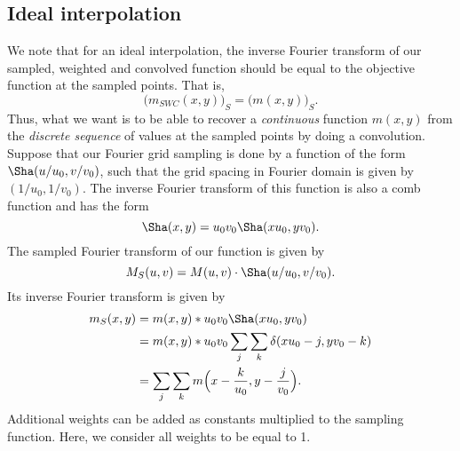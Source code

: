 \documentclass[11pt]{article}
\begin{document}
\subsection{Ideal interpolation}
We note that for an ideal interpolation, the inverse Fourier transform of our sampled, weighted and convolved function should be equal to the objective function at the sampled points. That is,
\begin{equation}
\Bigg(m_{SWC}(x,y)\Bigg)_S = \Bigg(m(x,y)\Bigg)_S.
\end{equation}
Thus, what we want is to be able to recover a \emph{continuous} function $m(x,y)$ from the \emph{discrete sequence} of values at the sampled points by doing a convolution.
Suppose that our Fourier grid sampling is done by a function of the form $\Sha(u/u_0,v/v_0)$, such that the grid spacing in Fourier domain is given by $(1/u_0, 1/v_0)$. The inverse Fourier transform of this function is also a comb function and has the form
\begin{equation}
\Sha(x,y) = u_0 v_0 \Sha(xu_0, yv_0).
\end{equation}
The sampled Fourier transform of our function is given by
\begin{equation}
M_{S}(u,v) = M(u,v) \cdot \Sha(u/u_0, v/v_0).
\end{equation}
Its inverse Fourier transform is given by
\begin{align}
m_{S}(x,y) &= m(x,y) \ast u_0v_0\Sha(xu_0, yv_0)\\
&= m(x,y) \ast u_0v_0\sum_j \sum_k \delta(xu_0-j, yv_0-k)\\
&=\sum_j \sum_k m\Big(x - \frac{k}{u_0}, y - \frac{j}{v_0}\Big).
\end{align}
Additional weights can be added as constants multiplied to the sampling function. Here, we consider all weights to be equal to 1.
\end{document}
